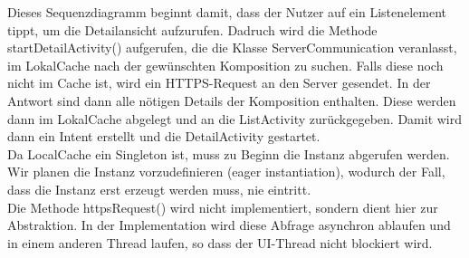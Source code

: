 Dieses Sequenzdiagramm beginnt damit, dass der Nutzer auf ein Listenelement tippt, um die Detailansicht aufzurufen. 
Dadruch wird die Methode startDetailActivity() aufgerufen, die die Klasse ServerCommunication veranlasst, im LokalCache nach der gewünschten Komposition zu suchen.
Falls diese noch nicht im Cache ist, wird ein HTTPS-Request an den Server gesendet.
In der Antwort sind dann alle nötigen Details der Komposition enthalten.
Diese werden dann im LokalCache abgelegt und an die ListActivity zurückgegeben.
Damit wird dann ein Intent erstellt und die DetailActivity gestartet.
\\
Da LocalCache ein Singleton ist, muss zu Beginn die Instanz abgerufen werden. Wir planen die Instanz vorzudefinieren (eager instantiation), wodurch der Fall, dass die Instanz erst erzeugt werden muss, nie eintritt.
\\
Die Methode httpsRequest() wird nicht implementiert, sondern dient hier zur Abstraktion. In der Implementation wird diese Abfrage asynchron ablaufen und in einem anderen Thread laufen, so dass der UI-Thread nicht blockiert wird. 

